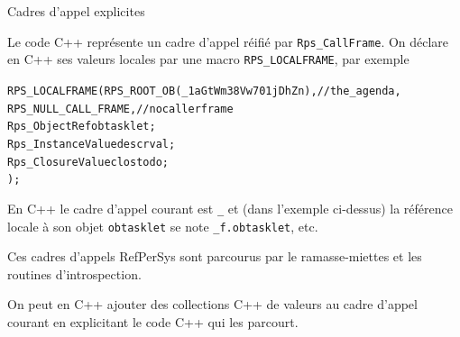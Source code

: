 \documentclass[final,a4,xcolor={svgnames,dvipsnames}]{beamer}
\begin{document}
 \begin{frame}{Cadres d'appel explicites}
   
   Le code C++ représente un cadre d'appel réifié par
   \texttt{Rps\_CallFrame}. On déclare en C++ ses valeurs locales par une macro \texttt{RPS\_LOCALFRAME}, par exemple

   \begin{relsize}{-1}
   \begin{alltt}
     RPS\_LOCALFRAME(RPS\_ROOT\_OB(\_1aGtWm38Vw701jDhZn), //the\_agenda,\\
     \hspace{8em}            RPS\_NULL\_CALL\_FRAME, // no caller frame\\
     \hspace{8em}            Rps\_ObjectRef obtasklet;\\
     \hspace{8em}            Rps\_InstanceValue descrval;\\
     \hspace{8em}            Rps\_ClosureValue clostodo;\\
                );
   \end{alltt}
   \end{relsize}
   
   En C++ le cadre d'appel courant est \texttt{\_} et (dans l'exemple ci-dessus) la référence locale à son objet \texttt{obtasklet} se note \texttt{\_f.obtasklet}, etc.
   
   Ces cadres d'appels RefPerSys sont parcourus par le ramasse-miettes et les routines d'introspection.

   On peut en C++ ajouter des collections C++ de valeurs au cadre
   d'appel courant en explicitant le code C++ qui les parcourt.
 \end{frame}
\end{document}
